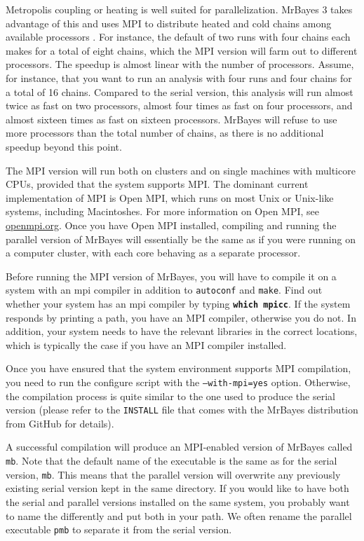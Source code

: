 \documentclass[12pt]{book}
\newcommand{\ttt}[1]{\texttt{#1}}
\newcommand{\tb}[1]{\ttt{\textbf{#1}}}
\begin{document}
Metropolis coupling or heating is well suited for parallelization. MrBayes 3 takes advantage of
this and uses MPI to distribute heated and cold chains among available processors
\citep{altekar04}. For instance, the default of two runs with four chains each makes for a total of
eight chains, which the MPI version will farm out to different processors. The speedup is almost
linear with the number of processors. Assume, for instance, that you want to run an analysis with
four runs and four chains for a total of 16 chains. Compared to the serial version, this analysis
will run almost twice as fast on two processors, almost four times as fast on four processors, and
almost sixteen times as fast on sixteen processors. MrBayes will refuse to use more processors than
the total number of chains, as there is no additional speedup beyond this point.

The MPI version will run both on clusters and on single machines with multicore CPUs, provided that
the system supports MPI. The dominant current implementation of MPI is Open MPI, which runs on most
Unix or Unix-like systems, including Macintoshes. For more information on Open MPI, see
\url{openmpi.org}. Once you have Open MPI installed, compiling and running the parallel version of
MrBayes will essentially be the same as if you were running on a computer cluster, with each core
behaving as a separate processor.

Before running the MPI version of MrBayes, you will have to compile it on a system with an mpi
compiler in addition to \ttt{autoconf} and \ttt{make}. Find out whether your system has an mpi
compiler by typing \tb{which mpicc}. If the system responds by printing a path, you have an MPI
compiler, otherwise you do not. In addition, your system needs to have the relevant libraries in
the correct locations, which is typically the case if you have an MPI compiler installed.

Once you have ensured that the system environment supports MPI compilation, you need to run the
configure script with the \ttt{--with-mpi=yes} option. Otherwise, the compilation process is
quite similar to the one used to produce the serial version (please refer to the \ttt{INSTALL} file
that comes with the MrBayes distribution from GitHub for details).

A successful compilation will produce an MPI-enabled version of MrBayes called \ttt{mb}. Note that
the default name of the executable is the same as for the serial version, \ttt{mb}. This means that
the parallel version will overwrite any previously existing serial version kept in the same
directory. If you would like to have both the serial and parallel versions installed on the same
system, you probably want to name the differently and put both in your path. We often rename the
parallel executable \ttt{pmb} to separate it from the serial version.
\end{document}
